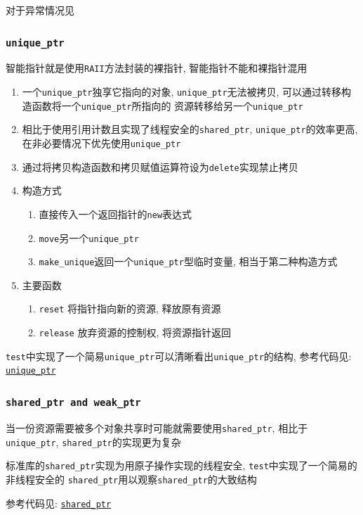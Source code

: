 \noindent 对于异常情况见 

\subsubsection{\tt unique\_ptr}
智能指针就是使用{\tt RAII}方法封装的裸指针, 智能指针不能和裸指针混用
\begin{enumerate}
	\item 一个{\tt unique\_ptr}独享它指向的对象, {\tt unique\_ptr}无法被拷贝, 可以通过转移构造函数将一个{\tt unique\_ptr}所指向的
		资源转移给另一个{\tt unique\_ptr}
	\item 相比于使用引用计数且实现了线程安全的{\tt shared\_ptr}, {\tt unique\_ptr}的效率更高, 在非必要情况下优先使用{\tt unique\_ptr}
	\item 通过将拷贝构造函数和拷贝赋值运算符设为{\tt delete}实现禁止拷贝
	\item 构造方式
	\begin{enumerate}
		\item 直接传入一个返回指针的{\tt new}表达式
		\item {\tt move}另一个{\tt unique\_ptr}
		\item {\tt make\_unique}返回一个{\tt unique\_ptr}型临时变量, 相当于第二种构造方式
	\end{enumerate}
	\item 主要函数
	\begin{enumerate}
		\item {\tt reset} 将指针指向新的资源, 释放原有资源
		\item {\tt release} 放弃资源的控制权, 将资源指针返回
	\end{enumerate}
\end{enumerate}
{\tt test}中实现了一个简易{\tt unique\_ptr}可以清晰看出{\tt unique\_ptr}的结构, 
	参考代码见: \href{https://github.com/wenqingqian/Obtuse/blob/main/test/cpp/c++11/smart_ptr/unique_ptr.h}{\tt unique\_ptr}
\subsubsection{\tt shared\_ptr and weak\_ptr}
当一份资源需要被多个对象共享时可能就需要使用{\tt shared\_ptr}, 相比于{\tt unique\_ptr}, {\tt shared\_ptr}的实现更为复杂

标准库的{\tt shared\_ptr}实现为用原子操作实现的线程安全, {\tt test}中实现了一个简易的非线程安全的
	{\tt shared\_ptr}用以观察{\tt shared\_ptr}的大致结构

参考代码见: \href{https://github.com/wenqingqian/Obtuse/blob/main/test/cpp/c++11/smart_ptr/shared_ptr.h}{\tt shared\_ptr}

